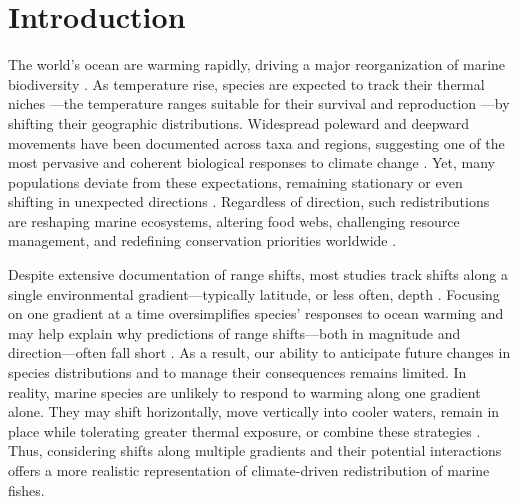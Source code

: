 \documentclass[lineno,pdflatex,sn-nature]{sn-jnl}%
\begin{document}
\section{Introduction}\label{Introduction}
The world's ocean are warming rapidly, driving a major reorganization of marine biodiversity \citep{ipcc_ocean_2019}. As temperature rise, species are expected to track their thermal niches ---the temperature ranges suitable for their survival and reproduction \citep{grinnell_niche-relationships_1917}---by shifting their geographic distributions. Widespread poleward and deepward movements have been documented across taxa and regions, suggesting one of the most pervasive and coherent biological responses to climate change \citep{parmesan_globally_2003, parmesan_ecological_2006, poloczanska_global_2013, poloczanska_responses_2016}. Yet, many populations deviate from these expectations, remaining stationary or even shifting in unexpected directions \citep{fuchs_wrong-way_2020, lawlor_mechanisms_2024}. Regardless of direction, such redistributions are reshaping marine ecosystems, altering food webs, challenging resource management, and redefining conservation priorities worldwide \citep{pinsky_preparing_2018, palacios-abrantes_climate_2025, pecl_biodiversity_2017}.

Despite extensive documentation of range shifts, most studies track shifts along a single environmental gradient—typically latitude, or less often, depth \citep{nye_changing_2009, dulvy_climate_2008, pinsky_marine_2013}. Focusing on one gradient at a time oversimplifies species’ responses to ocean warming and may help explain why predictions of range shifts—both in magnitude and direction—often fall short \citep{lawlor_mechanisms_2024, fredston_reimagining_2025}. As a result, our ability to anticipate future changes in species distributions and to manage their consequences remains limited. In reality, marine species are unlikely to respond to warming along one gradient alone. They may shift horizontally, move vertically into cooler waters, remain in place while tolerating greater thermal exposure, or combine these strategies \citep{nye_changing_2009}. Thus, considering shifts along multiple gradients and their potential interactions offers a more realistic representation of climate-driven redistribution of marine fishes.
\end{document}
